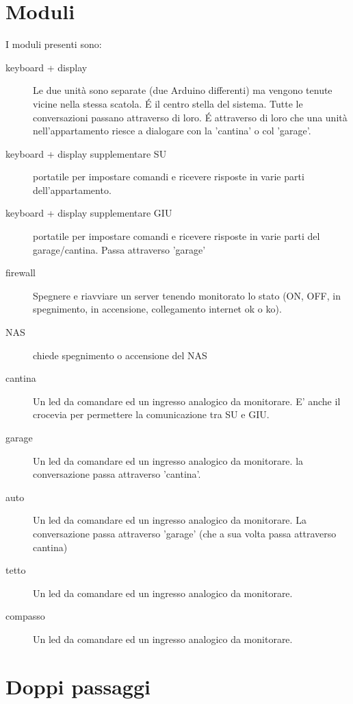 \documentclass{article}
\begin{document}
    
    \section{Moduli}
    
    I moduli presenti sono:
    
    \begin{description}
         \item [keyboard + display] Le due unità sono separate (due Arduino differenti) ma vengono tenute vicine nella stessa scatola. \'E il centro stella del sistema. Tutte le conversazioni passano attraverso di loro. \'E attraverso di loro che una unità nell'appartamento riesce a dialogare con la 'cantina' o col 'garage'.
         
         \item [keyboard + display supplementare SU] portatile per impostare comandi e ricevere risposte in varie parti dell'appartamento.

         \item [keyboard + display supplementare GIU] portatile per impostare comandi e ricevere risposte in varie parti del garage/cantina. Passa attraverso 'garage'
         
         \item [firewall] Spegnere e riavviare un server tenendo monitorato lo stato (ON, OFF, in spegnimento, in accensione, collegamento internet ok o ko).
         \item [NAS] chiede spegnimento o accensione del NAS
         \item [cantina] Un led da comandare ed un ingresso analogico da monitorare. E' anche il crocevia per permettere la comunicazione tra SU e GIU.
         \item [garage] Un led da comandare ed un ingresso analogico da monitorare. la conversazione passa attraverso 'cantina'.
         \item [auto] Un led da comandare ed un ingresso analogico da monitorare. La conversazione passa attraverso 'garage' (che a sua volta passa attraverso cantina)
         \item [tetto] Un led da comandare ed un ingresso analogico da monitorare.
         \item [compasso] Un led da comandare ed un ingresso analogico da monitorare.
    \end{description}
    
    \section{Doppi passaggi}
    
\end{document}

